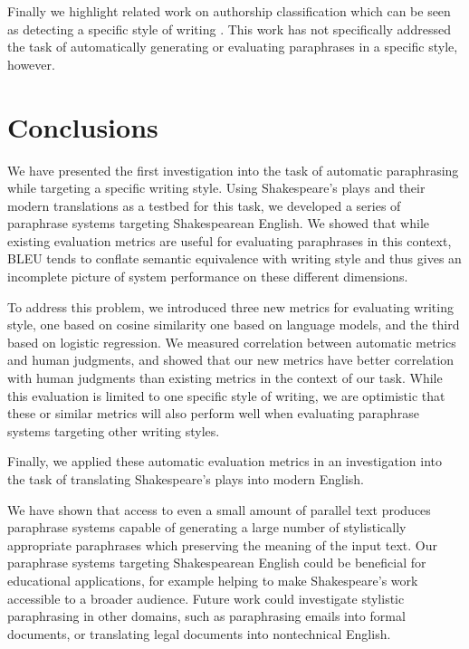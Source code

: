 \documentclass[10pt,a5paper,twoside]{article}
\begin{document}
Finally we highlight related work on authorship classification which can be seen as detecting a specific style of writing \cite{Gamon04,Raghavan10}.
This work has not specifically addressed the task of automatically generating or evaluating paraphrases in a specific style, however.

\section{Conclusions}
We have presented the first investigation into the task of automatic paraphrasing while targeting a specific writing style.  Using Shakespeare's plays and their
modern translations as a testbed for this task, we developed a series of paraphrase systems targeting Shakespearean English.  We showed that while existing evaluation
metrics are useful for evaluating paraphrases in this context, BLEU tends to conflate semantic equivalence with writing style and thus gives an incomplete picture of 
system performance on these different dimensions.

To address this problem, we introduced three new metrics for evaluating writing style, one based on cosine similarity one based on
language models, and the third based on logistic regression.
We measured correlation between automatic metrics and human judgments, and showed
that our new metrics have better correlation with human judgments than existing metrics in the context of our task.
While this evaluation is limited to one specific style of writing, we are optimistic that these or similar metrics will also perform well when
evaluating paraphrase systems targeting other writing styles.

Finally, we applied these automatic evaluation metrics in an investigation into the task of translating Shakespeare's plays into modern English.

We have shown that access to even a small amount of parallel text produces paraphrase systems 
capable of generating a large number of stylistically appropriate paraphrases which preserving the meaning of the input text.  
Our paraphrase systems targeting Shakespearean English could be beneficial for educational applications, for example helping to
make Shakespeare's work accessible to a broader audience.
Future work could investigate stylistic paraphrasing in other domains, such as paraphrasing emails into formal documents, or
translating legal documents into nontechnical English. 




\end{document}
